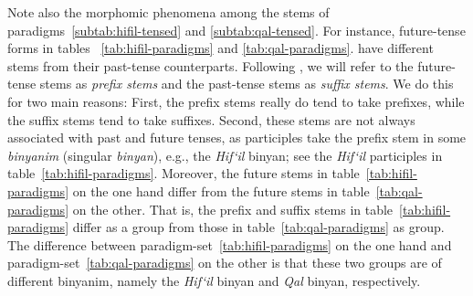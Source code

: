 {Note also the morphomic phenomena among the stems of  paradigms~\ref{subtab:hifil-tensed} and \ref{subtab:qal-tensed}.
For instance, future-tense forms in tables~ %
\ref{tab:hifil-paradigms} and \ref{tab:qal-paradigms}.
have different stems from their past-tense counterparts. Following \citet{vance:2004}, we will refer to the future-tense stems as \emph{prefix stems} and the past-tense stems as \emph{suffix stems}. We do this for two main reasons: First, the prefix stems really do tend to take prefixes, while the suffix stems tend to take suffixes. Second, these stems are not always associated with past and future tenses, as participles take the prefix stem in some \emph{binyanim} (singular \emph{binyan}), e.g., the \textit{Hif`il} binyan; see the \textit{Hif`il} participles in table~\ref{tab:hifil-paradigms}. 
Moreover, the future stems in table~\ref{tab:hifil-paradigms} on the one hand differ from the future stems in table~\ref{tab:qal-paradigms} on the other. That is, 
the prefix and suffix stems in table~\ref{tab:hifil-paradigms} differ as a group from those in table~\ref{tab:qal-paradigms} as group. The difference between paradigm-set~\ref{tab:hifil-paradigms} on the one hand and paradigm-set~\ref{tab:qal-paradigms} on the other is that these two groups are of different binyanim, namely the \emph{Hif`il} binyan and \emph{Qal} binyan, respectively.
 
}
